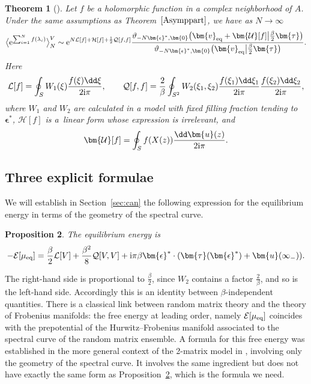 \documentclass[pdftex]{sigma}
\numberwithin{equation}{section}
\newtheorem{Theorem}{Theorem}[section]
\newtheorem{prop}[Theorem]{Proposition}
 { \theoremstyle{definition}
\newtheorem{Definition}[Theorem]{Definition}
\newtheorem{Note}[Theorem]{Note}
\newtheorem{Example}[Theorem]{Example}
\newtheorem{Remark}[Theorem]{Remark} }
\newcommand{\ee}{\mathrm{e}}
\begin{document}
\begin{Theorem}[{\cite[Theorem 1.6]{BGmulti}}]\label{thm:clt}
 Let $f$ be a holomorphic function in a complex neighborhood of $A$. Under the same assumptions as Theorem~$\ref{Asymppart}$, we have as $N \to \infty$
\[
\bigl\langle\ee^{\sum_{i=1}^{N}f(\lambda_i)}\bigr\rangle^{V}_{N} \sim{\rm e}^{N\mathcal{L}[f] + \mathcal{H}[f] + \frac{1}{2}\mathcal{Q}[f,f]} \frac{\vartheta_{-N\bm{\epsilon}^{*},\bm{0}}\bigl(\bm{v}_{{\rm eq}} + \bm{\mathcal{U}}[f] \big| \frac{\beta}{2}\bm{\tau}\bigr)}{\vartheta_{-N\bm{\epsilon}^{*},\bm{0}}\bigl(\bm{v}_{{\rm eq}} \big| \frac{\beta}{2}\bm{\tau}\bigr)} .
\]
Here
\[
\mathcal{L}[f] = \oint_{S} W_1(\xi)\frac{f(\xi)\dd\xi}{2{\rm i}\pi}, \qquad
\mathcal{Q}[f,f] = \frac{2}{\beta} \oint_{S^2} W_{2}(\xi_1,\xi_2) \frac{f(\xi_1)\dd \xi_1}{2{\rm i}\pi} \frac{f(\xi_2)\dd \xi_2}{2{\rm i}\pi},
\]
where $W_1$ and $W_2$ are calculated in a model with fixed filling fraction tending to $\bm{\epsilon}^*$,
$\mathcal{H}[f]$ is a~linear form whose expression is irrelevant, and
\[
\bm{\mathcal{U}}[f] = \oint_{S} f(X(z)) \frac{ \dd \bm{u}(z)}{2{\rm i}\pi}.
\]
\end{Theorem}


\subsection{Three explicit formulae}

We will establish in Section~\ref{sec:can} the following expression for the equilibrium energy in terms of the geometry of the spectral curve.
\begin{prop} \label{lem:Ef0} The equilibrium energy is
\[
-\mathcal{E}[\mu_{{\rm eq}}] = \frac{\beta}{2}\mathcal{L}[V] + \frac{\beta^2}{8}\mathcal{Q}[V,V] + {\rm i}\pi \beta \bm{\epsilon}^* \cdot  (\bm{\tau}(\bm{\epsilon}^*) + \bm{u}(\infty_-) ).
\]
\end{prop}
The right-hand side is proportional to $\frac{\beta}{2}$, since $W_2$ contains a factor $\frac{2}{\beta}$, and so is the left-hand side. Accordingly this is an identity between $\beta$-independent quantities. There is a classical link between random matrix theory and the theory
of Frobenius manifolds: the free energy at leading order,
namely $\mathcal{E}[\mu_{{\rm eq}}]$ coincides with the
prepotential of the Hurwitz--Frobenius manifold associated to the
spectral curve of the random matrix ensemble. A formula for this free energy was established in the more general context of the 2-matrix model in \cite{Bertola}, involving only the geometry of the spectral curve. It involves the same ingredient but does not have exactly the same form as Proposition~\ref{lem:Ef0}, which is the formula we need.
\end{document}
